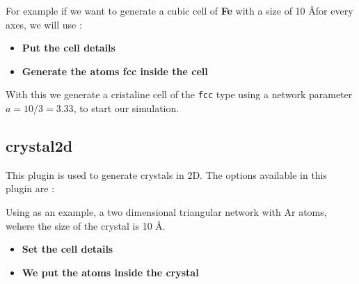 
For example if we want to generate a cubic cell of \textbf{Fe} with a size of
10 \AA for every axes, we will use :

\begin{itemize}
 \item \textbf{Put the cell details}
 \item \textbf{Generate the atoms fcc inside the cell}       
\end{itemize}


With this we generate a cristaline cell of the \verb|fcc| type using a network
parameter $ a = 10/3 = 3.33$, to start our simulation.

\subsection{crystal2d}

This plugin is used to generate crystals in 2D. The options available in this
plugin are :


Using as an example, a two dimensional triangular network with Ar atoms, wehere
the size of the crystal is 10 \AA.

\begin{itemize}
 \item \textbf{Set the cell details}
 \item \textbf{We put the atoms inside the crystal}
\end{itemize}

